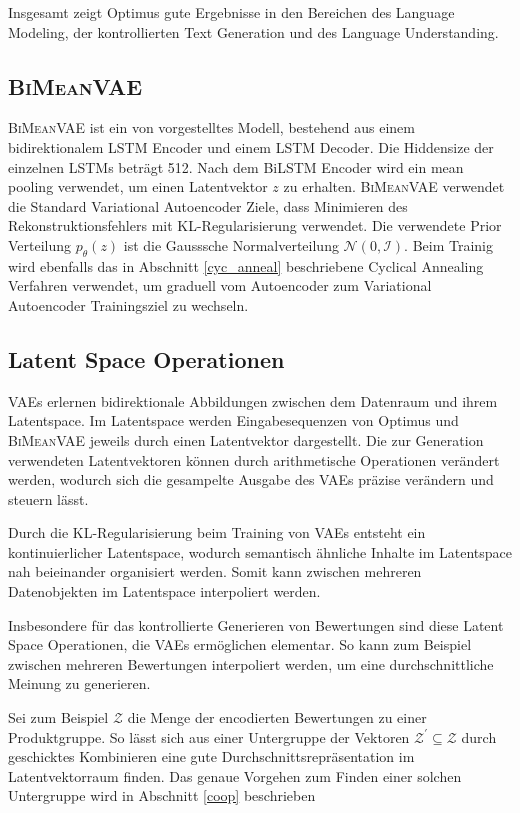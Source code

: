 Insgesamt zeigt Optimus gute Ergebnisse in den Bereichen des Language Modeling, der kontrollierten Text Generation und des Language Understanding.




\subsection{\textsc{BiMeanVAE}}
\textsc{BiMeanVAE} ist ein von \citep{coop} vorgestelltes Modell, bestehend aus einem bidirektionalem LSTM Encoder und einem LSTM Decoder. 
Die Hiddensize der einzelnen LSTMs beträgt 512. Nach dem BiLSTM Encoder wird ein mean pooling verwendet, um einen Latentvektor $z$ zu erhalten.
\textsc{BiMeanVAE} verwendet die Standard Variational Autoencoder Ziele, dass Minimieren des Rekonstruktionsfehlers mit KL-Regularisierung verwendet.
Die verwendete Prior Verteilung $p_\theta(z)$ ist die Gausssche Normalverteilung $\mathcal{N}(0,\mathcal{I})$. 
Beim Trainig wird ebenfalls das in Abschnitt \ref{cyc_anneal} beschriebene Cyclical Annealing Verfahren verwendet, um graduell vom Autoencoder zum Variational Autoencoder Trainingsziel zu wechseln.


\subsection{Latent Space Operationen}
VAEs erlernen bidirektionale Abbildungen zwischen dem Datenraum und ihrem Latentspace. 
Im Latentspace werden Eingabesequenzen von Optimus und \textsc{BiMeanVAE} jeweils durch einen Latentvektor dargestellt.
Die zur Generation verwendeten Latentvektoren können durch arithmetische Operationen verändert werden, wodurch sich die gesampelte Ausgabe des VAEs präzise verändern und steuern lässt.

Durch die KL-Regularisierung beim Training von VAEs entsteht ein kontinuierlicher Latentspace, wodurch semantisch ähnliche Inhalte im Latentspace nah beieinander organisiert werden.
Somit kann zwischen mehreren Datenobjekten im Latentspace interpoliert werden.

Insbesondere für das kontrollierte Generieren von Bewertungen sind diese Latent Space Operationen, die VAEs ermöglichen elementar.
So kann zum Beispiel zwischen mehreren Bewertungen interpoliert werden, um eine durchschnittliche Meinung zu generieren.

Sei zum Beispiel $\mathcal{Z}$ die Menge der encodierten Bewertungen zu einer Produktgruppe.
So lässt sich aus einer Untergruppe der Vektoren $\mathcal{Z}^{'} \subseteq \mathcal{Z}$ durch geschicktes Kombinieren eine gute Durchschnittsrepräsentation im Latentvektorraum finden.
Das genaue Vorgehen zum Finden einer solchen Untergruppe wird in Abschnitt \ref{coop} beschrieben
\pagebreak
